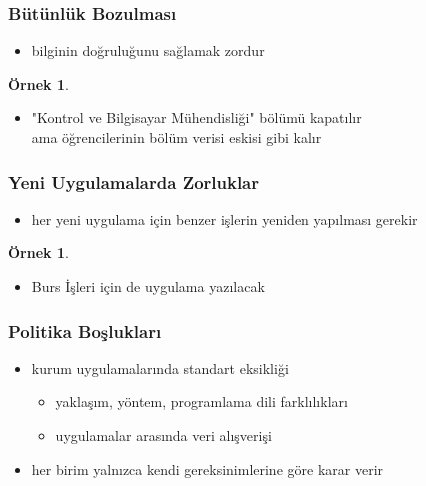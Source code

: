 \documentclass[dvipsnames]{beamer}
\theoremstyle{definition}
\theoremstyle{example}
\newtheorem{ornek}[theorem]{Örnek}
\theoremstyle{plain}
\begin{document}
\begin{frame}
  \frametitle{Bütünlük Bozulması}

  \begin{itemize}
    \item bilginin doğruluğunu sağlamak zordur
  \end{itemize}

  \pause
  \begin{ornek}
    \begin{itemize}
      \item "Kontrol ve Bilgisayar Mühendisliği" bölümü kapatılır\\
        ama öğrencilerinin bölüm verisi eskisi gibi kalır
    \end{itemize}
  \end{ornek}
\end{frame}

\begin{frame}
  \frametitle{Yeni Uygulamalarda Zorluklar}

  \begin{itemize}
    \item her yeni uygulama için benzer işlerin yeniden yapılması gerekir
  \end{itemize}

  \pause
  \begin{ornek}
    \begin{itemize}
      \item Burs İşleri için de uygulama yazılacak
    \end{itemize}
  \end{ornek}
\end{frame}

\begin{frame}
  \frametitle{Politika Boşlukları}

  \begin{itemize}
    \item kurum uygulamalarında standart eksikliği
    \begin{itemize}
      \item yaklaşım, yöntem, programlama dili farklılıkları
      \item uygulamalar arasında veri alışverişi
    \end{itemize}

    \pause
    \item her birim yalnızca kendi gereksinimlerine göre karar verir
  \end{itemize}
\end{frame}
\end{document}
